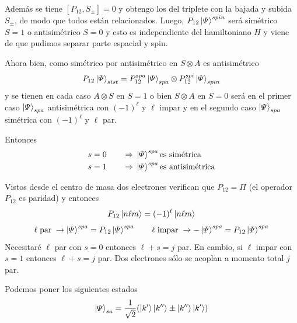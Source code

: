 \documentclass[10pt,oneside]{CBFT_book}
\begin{document}
Además se tiene $ [P_{12}, S_\pm] = 0 $ y obtengo los del triplete con la bajada y subida $S_\pm$,
de modo que todos están relacionados.
Luego, $ P_{12} \ket{\Psi}^{spin} $ será simétrico $S=1$ o antisimétrico $S=0$ y esto es 
independiente del hamiltoniano $H$ y viene de que pudimos separar parte espacial y spin.

Ahora bien, como simétrico por antisimétrico en $S\otimes A$ es antisimétrico
\[
	P_{12} \Ket{\Psi}_{sist} =
	P_{12}^{spa} \Ket{\Psi}_{spa} \otimes P_{12}^{spi} \Ket{\Psi}_{spin}
\]
y se tienen en cada caso $A \otimes S$ en $S=1$ o bien $S \otimes A$ en $S=0$ será
en el primer caso $\Ket{\Psi}_{spa}$ antisimétrica con $(-1)^\ell$ y $\ell$ impar 
y en el segundo caso $\Ket{\Psi}_{spa}$ simétrica con $(-1)^\ell$ y $\ell$ par. 


Entonces
\begin{gather*}
	\begin{aligned}
	s=0 \qquad \Rightarrow \; &\Ket{\Psi}^{spa} \text{es simétrica} \\
	s=1 \qquad \Rightarrow \; &\Ket{\Psi}^{spa} \text{es antisimétrica}
	\end{aligned}	
\end{gather*}	

Vistos desde el centro de masa dos electrones verifican que $ P_{12} = \Pi $ 
(el operador $P_{12}$ es paridad) y entonces
\[
	P_{12}\Ket{n\ell m} = (-1)^\ell \Ket{n\ell m}
\]
\[
	\ell \;\text{par} \; \rightarrow \Ket{\Psi}^{spa} = P_{12} \Ket{\Psi}^{spa} \qquad 
	\ell \;\text{impar} \; \rightarrow -\Ket{\Psi}^{spa} = P_{12} \Ket{\Psi}^{spa}
\]
Necesitaré $\ell$ par con $s=0$ entonces $\ell+s=j$ par. En cambio, si $\ell$ impar con $s=1$ entonces 
$\ell+s=j$ par. Dos electrones sólo se acoplan a momento total $j$ par.

Podemos poner los siguientes estados 
\[
	\Ket{ \Psi }_{sa} = \frac{1}{\sqrt{2}}( \Ket{k'}\Ket{k''} \pm \Ket{k''}\Ket{k'})
\]
\end{document}
